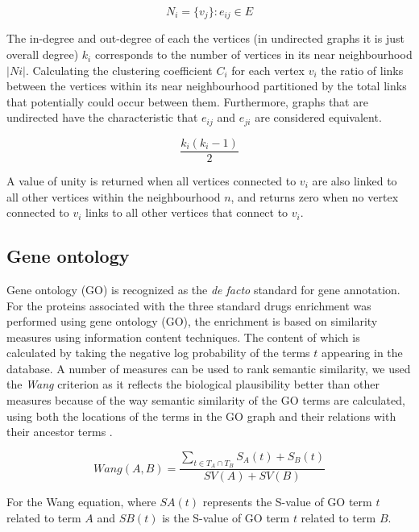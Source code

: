 \documentclass[preprint,12pt]{elsarticle}
\begin{document}
\begin{equation}\label{neighbour}
     N_{i}  =  \{v_{j}\}:e_{ij} \in E
\end{equation}

The in-degree and out-degree of each the vertices (in undirected graphs it is just overall degree) $k_i$  corresponds to the number of vertices in its near neighbourhood $| Ni |$.  Calculating the clustering coefficient $C_i$ for each vertex $v_i$ the ratio of links between the vertices within its near neighbourhood partitioned by the total  links that potentially could occur between them. Furthermore, graphs that are undirected have the characteristic that $e_{ij}$ and $e_{ji}$ are considered equivalent. 

\begin{equation}\label{edges}
    \frac{k_{i}(k_{i} - 1)}{2}
\end{equation}

A value of unity is returned when all vertices connected to $v_i$ are also linked to all other vertices
within the neighbourhood $n$, and returns zero when no vertex connected to $v_i$ links to all other vertices that connect to $v_i$.  

\subsection{Gene ontology}
Gene ontology (GO) is recognized as the {\it de facto} standard for gene annotation. For the proteins associated with the three standard drugs enrichment was performed using gene ontology (GO), the enrichment is based on similarity measures using information content techniques. The content of which is calculated by taking the negative log probability of the terms $t$ appearing in the database. A number of measures can be used to rank semantic similarity, we used the {\it Wang} criterion as it reflects the biological plausibility better than other measures because of the way semantic similarity of the GO terms are calculated, using both the locations of the terms in the GO graph and their relations with their ancestor terms \cite{Wang2007}.

\begin{equation}
         Wang(A, B) = \frac{\displaystyle\sum_{t \in T_{A} \cap T_{B}}{S_{A}(t) + S_{B}(t)}}{SV(A) + SV(B)}
\label{goe}
\end{equation}

For the Wang equation, where $SA(t)$ represents the S-value of GO term $t$ related to term $A$ and $SB(t)$ is the S-value of GO term $t$ related to term $B$.
\end{document}
